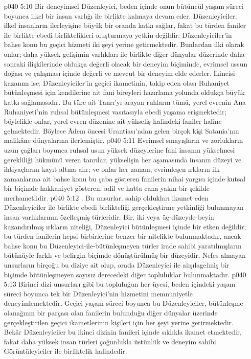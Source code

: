 \vs p040 5:10 Bir deneyimsel Düzenleyici, beden içinde onun bütüncül yaşam süreci boyunca ilkel bir insan varlığı ile birlikte kalmaya devam eder. Düzenleyiciler; ilkel insanların ilerleyişine büyük bir oranda katkı sağlar, fakat bu türden faniler ile birlikte ebedi birliktelikleri oluşturmaya yetkin değildir. Düzenleyiciler’in bahse konu bu geçici hizmeti iki şeyi yerine getirmektedir. Bunlardan ilki olarak onlar; daha yüksek gelişimin varlıkları ile birlikte diğer dünyalar düzerinde daha sonraki ilişkilerinde oldukça değerli olacak bir deneyim biçiminde, evrimsel ussun doğası ve çalışması içinde değerli ve mevcut bir deneyim elde ederler. İkincisi kazanım ise; Düzenleyiciler’in geçici ikametinin, takip eden olası Ruhaniyet bütünleşmesi için kendilerine ait fani bireyleri hazırlama yolunda oldukça büyük katkı sağlamasıdır. Bu türe ait Tanrı’yı arayan ruhların tümü, yerel evrenin Ana Ruhaniyeti’nin ruhsal bütünleşmesi vasıtasıyla ebedi yaşama erişmektedir; böylelikle onlar, yerel evren düzenine ait yükseliş halindeki faniler haline gelmektedir. Böylece Âdem öncesi Urantiası’ndan gelen birçok kişi Satania’nın malikâne dünyalarına ilerlemiştir.
\vs p040 5:11 Evrimsel sınayışların ve zorlukların uzun çağları boyunca ruhsal usun yüksek düzeylerine fani insanın yükselmesi gerekliliği hükmünü veren tanrılar, yükselişin her aşamasında insanın düzeyi ve ihtiyaçlarını kayıt altına alır; ve onlar her zaman, evrimleşen ırkların ilk zamanlarına ait bahse konu bu çaba gösteren fanilerin nihai yargısı içinde kutsal bir biçimde hakkaniyet gösteren, adil ve hatta cana yakın bir şekilde merhametlidir.
\vs p040 5:12 . Bu unsurlar, sahip oldukları ikamet eden Düzenleyiciler ile birlikte ebedi birlikteliği gerçekleştirme yetkinliği bulunmayan insan varlıklarının özelleşmiş türleridir. Bir, iki veya üç\hyp{}düzeyde\hyp{}beyin kazandırılmış ırkların niteliği, Düzenleyici bütünleşmesi içinde bir etken değildir; bu türden fanilerin hepsi birbirlerine benzer bir nitelikte bulunmaktadır, ancak bahse konu bu Düzenleyici\hyp{}ile\hyp{}bütünleşmeyen türler irade sahibi yaratılmışların bütünüyle farklı ve belirgin biçimde dönüştürülmüş bir düzeyidir. Nefes almayan unsurların birçoğu bu diziye ait olup, orada Düzenleyici ile alışılagelmiş bir biçimde bütünleşmeyen sayısız derecedeki diğer topluluklar bulunmaktadır.
\vs p040 5:13 Birinci dizi unsurları gibi bu topluluğun her üyesi, beden içindeki yaşam süreci boyunca tek bir Düzenleyici’nin hizmetini memnuniyetle deneyimlemektedir. Geçici yaşam süreci boyunca bu Düzenleyiciler, bütünleşme olanağının bir parçası olan fanilerin bulunduğu diğer dünyalar üzerinde gerçekleştirilen geçici ikametlerinin kişileri için her şeyi yerine getirmektedir. Bekâr Düzenleyiciler bu ikinci dizinin fanileri içinde sıklıkla ikamet etmektedir, fakat daha yüksek insan türleri çoğunlukla üstünlük ve deneyim sahibi Görüntüleyiciler ile birliktelik halindedir.
